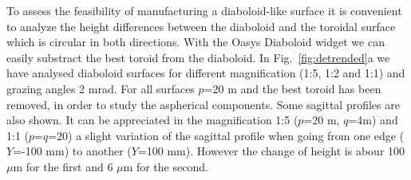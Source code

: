 \documentclass{iucr}              %
\begin{document}

To assess the feasibility of manufacturing a diaboloid-like surface it is convenient to analyze the height differences between the diaboloid and the toroidal surface which is circular in both directions. With the Oasys Diaboloid widget we can easily substract the best toroid from the diaboloid. In Fig.~\ref{fig:detrended}a we have analysed diaboloid surfaces for different magnification (1:5, 1:2 and 1:1) and grazing angles 2 mrad. For all surfaces $p$=20 m and the best toroid has been removed, in order to study the aspherical components. Some sagittal profiles are also shown. It can be appreciated in the magnification 1:5 ($p$=20 m, $q$=4m) and 1:1 ($p$=$q$=20) a slight variation of the sagittal profile when going from one edge ($Y$=-100 mm) to another ($Y$=100 mm). However the change of height is abour 100 $\mu$m for the first and 6 $\mu$m for the second. 

\end{document}
